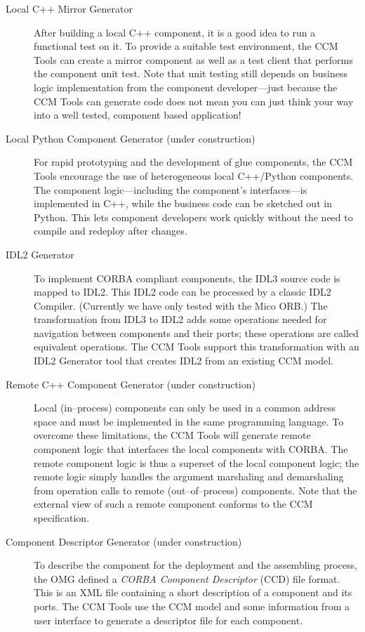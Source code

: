 \begin{description}
\item [Local C++ Mirror Generator]
After building a local C++ component, it is a good idea to run a functional test
on it. To provide a suitable test environment, the CCM Tools can create a mirror
component as well as a test client that performs the component unit test. Note
that unit testing still depends on business logic implementation from the
component developer---just because the CCM Tools can generate code does not mean
you can just think your way into a well tested, component based application!

\item [Local Python Component Generator (under construction)]
For rapid prototyping and the development of glue components, the CCM Tools
encourage the use of heterogeneous local C++/Python components. The component
logic---including the component's interfaces---is implemented in C++, while the
business code can be sketched out in Python. This lets component developers work
quickly without the need to compile and redeploy after changes.

\item [IDL2 Generator]
To implement CORBA compliant components, the IDL3 source code is mapped to IDL2.
This IDL2 code can be processed by a classic IDL2 Compiler. (Currently we have
only tested with the Mico ORB.) The transformation from IDL3 to IDL2 adds some
operations needed for navigation between components and their ports; these
operations are called equivalent operations. The CCM Tools support this
transformation with an IDL2 Generator tool that creates IDL2 from an existing
CCM model.

\item [Remote C++ Component Generator (under construction)]
Local (in--process) components can only be used in a common address space and
must be implemented in the same programming language. To overcome these
limitations, the CCM Tools will generate remote component logic that interfaces
the local components with CORBA. The remote component logic is thus a superset
of the local component logic; the remote logic simply handles the argument
marshaling and demarshaling from operation calls to remote (out--of--process)
components. Note that the external view of such a remote component conforms to
the CCM specification.

\item [Component Descriptor Generator (under construction)]
To describe the component for the deployment and the assembling process, the OMG
defined a {\it CORBA Component Descriptor} (CCD) file format. This is an XML
file containing a short description of a component and its ports. The CCM Tools
use the CCM model and some information from a user interface to generate a
descriptor file for each component.

\end{description}


